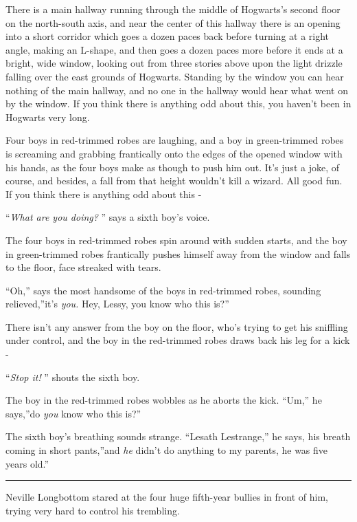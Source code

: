 There is a main hallway running through the middle of Hogwarts's second
floor on the north-south axis, and near the center of this hallway there
is an opening into a short corridor which goes a dozen paces back before
turning at a right angle, making an L-shape, and then goes a dozen paces
more before it ends at a bright, wide window, looking out from three
stories above upon the light drizzle falling over the east grounds of
Hogwarts. Standing by the window you can hear nothing of the main
hallway, and no one in the hallway would hear what went on by the
window. If you think there is anything odd about this, you haven't been
in Hogwarts very long.

Four boys in red-trimmed robes are laughing, and a boy in green-trimmed
robes is screaming and grabbing frantically onto the edges of the opened
window with his hands, as the four boys make as though to push him out.
It's just a joke, of course, and besides, a fall from that height
wouldn't kill a wizard. All good fun. If you think there is anything odd
about this -

``\emph{What are you doing?} '' says a sixth boy's voice.

The four boys in red-trimmed robes spin around with sudden starts, and
the boy in green-trimmed robes frantically pushes himself away from the
window and falls to the floor, face streaked with tears.

``Oh,'' says the most handsome of the boys in red-trimmed robes,
sounding relieved,''it's \emph{you.} Hey, Lessy, you know who this is?''

There isn't any answer from the boy on the floor, who's trying to get
his sniffling under control, and the boy in the red-trimmed robes draws
back his leg for a kick -

``\emph{Stop it!} '' shouts the sixth boy.

The boy in the red-trimmed robes wobbles as he aborts the kick. ``Um,''
he says,''do \emph{you} know who this is?''

The sixth boy's breathing sounds strange. ``Lesath Lestrange,'' he says,
his breath coming in short pants,''and \emph{he} didn't do anything to
my parents, he was five years old.''

\begin{center}\rule{3in}{0.4pt}\end{center}

Neville Longbottom stared at the four huge fifth-year bullies in front
of him, trying very hard to control his trembling.

